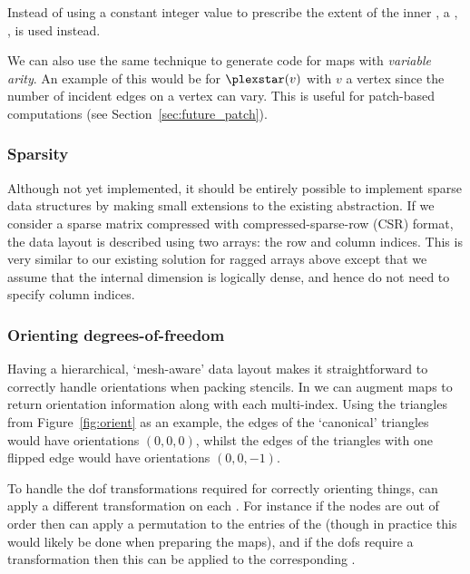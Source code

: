 Instead of using a constant integer value to prescribe the extent of the inner , a , , is used instead.

We can also use the same technique to generate code for maps with \textit{variable arity}.
An example of this would be for $\plexstar(v)$ with $v$ a vertex since the number of incident edges on a vertex can vary.
This is useful for patch-based computations (see Section~\ref{sec:future_patch}).

\subsubsection{Sparsity}
\label{sec:impl_datalayout_sparsity}

Although not yet implemented, it should be entirely possible to implement sparse data structures by making small extensions to the existing abstraction.
If we consider a sparse matrix compressed with compressed-sparse-row (CSR) format, the data layout is described using two arrays: the row and column indices.
This is very similar to our existing solution for ragged arrays above except that we assume that the internal dimension is logically dense, and hence do not need to specify column indices.

\subsubsection{Orienting degrees-of-freedom}
\label{sec:impl_orientation}


Having a hierarchical, `mesh-aware' data layout makes it straightforward to correctly handle orientations when packing stencils.
In  we can augment maps to return orientation information along with each multi-index.
Using the triangles from Figure~\ref{fig:orient} as an example, the edges of the `canonical' triangles would have orientations $(0,0,0)$, whilst the edges of the triangles with one flipped edge would have orientations $(0,0,-1)$.

To handle the \gls{dof} transformations required for correctly orienting things,  can apply a different transformation on each .
For instance if the nodes are out of order then  can apply a permutation to the entries of the  (though in practice this would likely be done when preparing the maps), and if the \glspl{dof} require a transformation then this can be applied to the corresponding .

